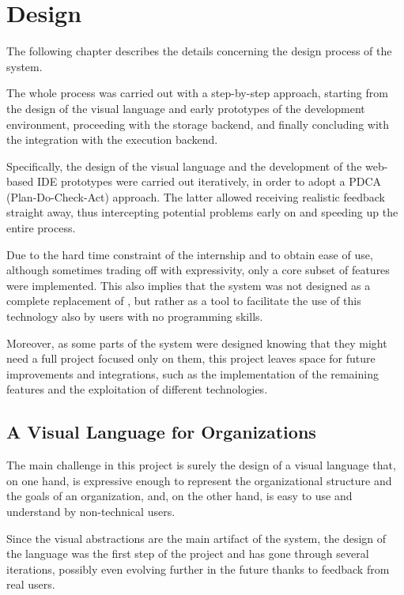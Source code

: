 \chapter{Design}\label{design}

The following chapter describes the details concerning the design process of the system.

The whole process was carried out with a step-by-step approach, starting from the design of the visual language and early prototypes of the development environment, proceeding with the storage backend, and finally concluding with the integration with the execution backend.

Specifically, the design of the visual language and the development of the web-based IDE prototypes were carried out iteratively, in order to adopt a PDCA (Plan-Do-Check-Act) approach.
The latter allowed receiving realistic feedback straight away, thus intercepting potential problems early on and speeding up the entire process.

Due to the hard time constraint of the internship and to obtain ease of use, although sometimes trading off with expressivity, only a core subset of \moise{} features were implemented.
This also implies that the system was not designed as a complete replacement of \moise{}, but rather as a tool to facilitate the use of this technology also by users with no programming skills.

Moreover, as some parts of the system were designed knowing that they might need a full project focused only on them, this project leaves space for future improvements and integrations, such as the implementation of the remaining features and the exploitation of different technologies.

\section{A Visual Language for Organizations}\label{visual-language}
The main challenge in this project is surely the design of a visual language that, on one hand, is expressive enough to represent the organizational structure and the goals of an organization, and, on the other hand, is easy to use and understand by non-technical users.

Since the visual abstractions are the main artifact of the system, the design of the language was the first step of the project and has gone through several iterations, possibly even evolving further in the future thanks to feedback from real users.

